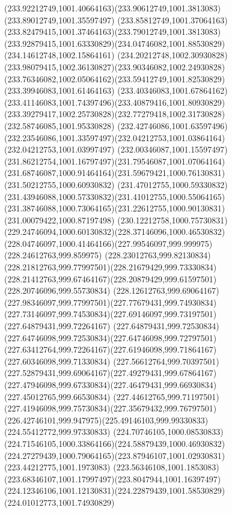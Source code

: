 {{		\curveto(233.92212749,1001.40664163)(233.90612749,1001.3813083)(233.89012749,1001.35597497)
		\curveto(233.85812749,1001.37064163)(233.82479415,1001.37464163)(233.79012749,1001.3813083)
		\curveto(233.92879415,1001.63330829)(234.04746082,1001.88530829)(234.14612748,1002.15864161)
		\curveto(234.20212748,1002.30930828)(233.98079415,1002.36130827)(233.90346082,1002.24930828)
		\curveto(233.76346082,1002.05064162)(233.59412749,1001.82530829)(233.39946083,1001.61464163)
		\curveto(233.40346083,1001.67864162)(233.41146083,1001.74397496)(233.40879416,1001.80930829)
		\curveto(233.39279417,1002.25730828)(232.77279418,1002.31730828)(232.58746085,1001.95330828)
		\curveto(232.42746086,1001.63597496)(232.23546086,1001.33597497)(232.04212753,1001.03864164)
		\lineto(232.04212753,1001.03997497)
		\curveto(232.00346087,1001.15597497)(231.86212754,1001.16797497)(231.79546087,1001.07064164)
		\curveto(231.68746087,1000.91464164)(231.59679421,1000.76130831)(231.50212755,1000.60930832)
		\curveto(231.47012755,1000.59330832)(231.43946088,1000.57330832)(231.41012755,1000.55064165)
		\curveto(231.38746088,1000.73064165)(231.22612755,1000.90130831)(231.00079422,1000.87197498)
		\curveto(230.12212758,1000.75730831)(229.24746094,1000.60130832)(228.37146096,1000.46530832)
		\curveto(228.04746097,1000.41464166)(227.99546097,999.999975)(228.24612763,999.859975)
		\curveto(228.23012763,999.82130834)(228.21812763,999.77997501)(228.21679429,999.73330834)
		\curveto(228.21412763,999.67464167)(228.20879429,999.61597501)(228.20746096,999.55730834)
		\curveto(228.12612763,999.69064167)(227.98346097,999.77997501)(227.77679431,999.74930834)
		\curveto(227.73146097,999.74530834)(227.69146097,999.73197501)(227.64879431,999.72264167)
		\curveto(227.64879431,999.72530834)(227.64746098,999.72530834)(227.64746098,999.72797501)
		\curveto(227.63412764,999.72264167)(227.61946098,999.71864167)(227.60346098,999.71330834)
		\curveto(227.56612764,999.70397501)(227.52879431,999.69064167)(227.49279431,999.67864167)
		\curveto(227.47946098,999.67330834)(227.46479431,999.66930834)(227.45012765,999.66530834)
		\curveto(227.44612765,999.71197501)(227.41946098,999.75730834)(227.35679432,999.76797501)
		\curveto(226.42746101,999.947975)(225.49146103,999.99330833)(224.55412772,999.97330833)
		\curveto(224.70746105,1000.08530833)(224.71546105,1000.33864166)(224.58879439,1000.46930832)
		\curveto(224.27279439,1000.79064165)(223.87946107,1001.02930831)(223.44212775,1001.1973083)
		\curveto(223.56346108,1001.1853083)(223.68346107,1001.17997497)(223.8047944,1001.16397497)
		\curveto(224.12346106,1001.12130831)(224.22879439,1001.58530829)(224.01012773,1001.74930829)
}}
